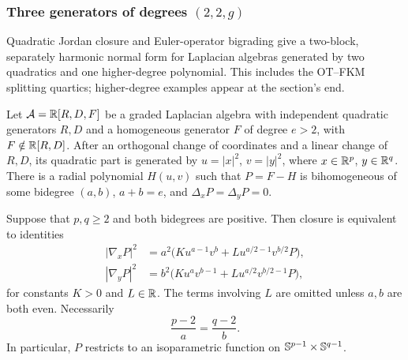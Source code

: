 \subsubsection{Three generators of degrees \texorpdfstring{$(2,2,g)$}{(2,2,g)}}\label{sec:two-block-extension}

Quadratic Jordan closure \cite[Proposition~37(b)]{MendesRadeschi}
and Euler-operator bigrading \cite[Proposition~19(a)]{MendesRadeschiQuadratic}
give a two-block, separately harmonic normal form for Laplacian
algebras generated by two quadratics and one higher-degree polynomial.
This includes the OT--FKM splitting quartics; higher-degree examples
appear at the section's end.

\begin{proposition}\label{prop:two-block-normal}
Let $\mathcal A=\mathbb R[R,D,F]$ be a graded Laplacian algebra with independent
quadratic generators $R,D$ and a homogeneous generator $F$ of degree
$e>2$, with $F\notin\mathbb R[R,D]$. After an orthogonal
change of coordinates and a linear change of $R,D$, its quadratic
part is generated by $u=|x|^2$, $v=|y|^2$, where
$x\in\mathbb R^p$, $y\in\mathbb R^q$. There is a radial polynomial $H(u,v)$
such that $P=F-H$ is bihomogeneous of some bidegree $(a,b)$,
$a+b=e$, and $\Delta_xP=\Delta_yP=0$.

Suppose that $p,q\geq2$ and both bidegrees are positive. Then closure
is equivalent to identities
\begin{align}
 |\nabla_xP|^2&=a^2\bigl(Ku^{a-1}v^b+
               Lu^{a/2-1}v^{b/2}P\bigr),\label{eq:two-block-x}\\
 |\nabla_yP|^2&=b^2\bigl(Ku^av^{b-1}+
               Lu^{a/2}v^{b/2-1}P\bigr),\label{eq:two-block-y}
\end{align}
for constants $K>0$ and $L\in\mathbb R$. The terms involving $L$ are
omitted unless $a,b$ are both even. Necessarily
\begin{equation}\label{eq:two-block-dimensions}
 \frac{p-2}{a}=\frac{q-2}{b}.
\end{equation}
In particular, $P$ restricts to an isoparametric function on
$\mathbb S^{p-1}\times\mathbb S^{q-1}$.
\end{proposition}

